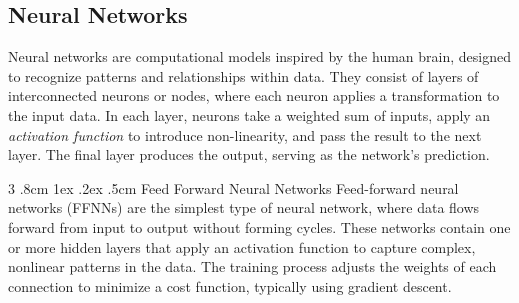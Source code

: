 \documentclass[%
reprint,s
amsmath,amssymb,
aps,
]{revtex4-2}
\makeatletter
\renewcommand{\subsubsection}{%
	\@startsection
	{subsubsection}%
	{3}%
	{\z@}%
	{.8cm \@plus1ex \@minus .2ex}%
	{.5cm}%
	{\normalfont\small\centering}%
}
\makeatother
\begin{document}
\subsection{Neural Networks}	\label{sec:neutral_networks}
Neural networks are computational models inspired by the human brain, designed to recognize patterns and relationships within data. They consist of layers of interconnected neurons or nodes, where each neuron applies a transformation to the input data. In each layer, neurons take a weighted sum of inputs, apply an \textit{activation function} to introduce non-linearity, and pass the result to the next layer. The final layer produces the output, serving as the network’s prediction.

\subsubsection{Feed Forward Neural Networks}
Feed-forward neural networks (FFNNs) are the simplest type of neural network, where data flows forward from input to output without forming cycles. These networks contain one or more hidden layers that apply an activation function to capture complex, nonlinear patterns in the data. The training process adjusts the weights of each connection to minimize a cost function, typically using gradient descent.
\end{document}
